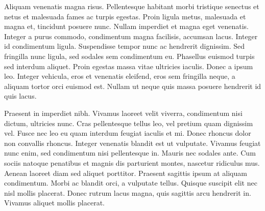 Aliquam venenatis magna risus. Pellentesque habitant morbi tristique senectus et netus et malesuada fames ac turpis egestas. Proin ligula metus, malesuada et magna et, tincidunt posuere nunc. Nullam imperdiet et magna eget venenatis. Integer a purus commodo, condimentum magna facilisis, accumsan lacus. Integer id condimentum ligula. Suspendisse tempor nunc ac hendrerit dignissim. Sed fringilla nunc ligula, sed sodales sem condimentum eu. Phasellus euismod turpis sed interdum aliquet. Proin egestas massa vitae ultricies iaculis. Donec a ipsum leo. Integer vehicula, eros et venenatis eleifend, eros sem fringilla neque, a aliquam tortor orci euismod est. Nullam ut neque quis massa posuere hendrerit id quis lacus.

Praesent in imperdiet nibh. Vivamus laoreet velit viverra, condimentum nisi dictum, ultricies nunc. Cras pellentesque tellus leo, vel pretium quam dignissim vel. Fusce nec leo eu quam interdum feugiat iaculis et mi. Donec rhoncus dolor non convallis rhoncus. Integer venenatis blandit est ut vulputate. Vivamus feugiat nunc enim, sed condimentum nisi pellentesque in. Mauris nec sodales ante. Cum sociis natoque penatibus et magnis dis parturient montes, nascetur ridiculus mus. Aenean laoreet diam sed aliquet porttitor. Praesent sagittis ipsum at aliquam condimentum. Morbi ac blandit orci, a vulputate tellus. Quisque suscipit elit nec nisl mollis placerat. Donec rutrum lacus magna, quis sagittis arcu hendrerit in. Vivamus aliquet mollis placerat. 
